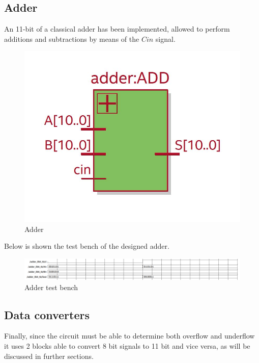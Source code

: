 \documentclass[12pt]{article}
\begin{document}
\newpage

\subsection*{Adder}

An 11-bit of a classical adder has been implemented, allowed to perform additions and subtractions by means of the  $Cin$ signal.
\begin{figure}[h!]
	\centering
	\includegraphics[scale = 0.65]{immagini/adder.jpg}
	\caption{Adder}
\end{figure}


Below is shown the test bench of the designed adder.


\begin{figure}[h]
	\centering
	\includegraphics[scale = 0.55]{immagini/adder_tb.png}
	\caption{Adder test bench}
\end{figure}

\subsection*{Data converters}

Finally, since the circuit must be able to determine both overflow and underflow it uses 2 blocks able to convert 8 bit signals to 11 bit and vice versa, as will be discussed in further sections. 
\end{document}

